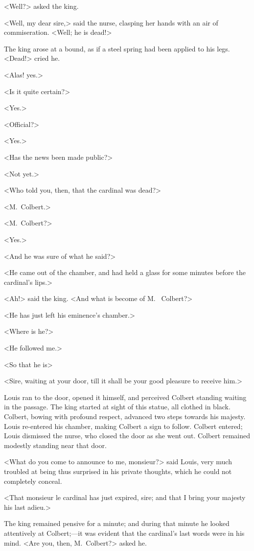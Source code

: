 <Well?> asked the king.

<Well, my dear sire,> said the nurse, clasping her hands with an air of commiseration. <Well; he is dead!>

The king arose at a bound, as if a steel spring had been applied to his legs. <Dead!> cried he.

<Alas! yes.>

<Is it quite certain?>

<Yes.>

<Official?>

<Yes.>

<Has the news been made public?>

<Not yet.>

<Who told you, then, that the cardinal was dead?>

<M.~Colbert.>

<M.~Colbert?>

<Yes.>

<And he was sure of what he said?>

<He came out of the chamber, and had held a glass for some minutes before the cardinal's lips.>

<Ah!> said the king. <And what is become of M.~ Colbert?>

<He has just left his eminence's chamber.>

<Where is he?>

<He followed me.>

<So that he is\longdash>

<Sire, waiting at your door, till it shall be your good pleasure to receive him.>

Louis ran to the door, opened it himself, and perceived Colbert standing waiting in the passage. The king started at sight of this statue, all clothed in black. Colbert, bowing with profound respect, advanced two steps towards his majesty. Louis re-entered his chamber, making Colbert a sign to follow. Colbert entered; Louis dismissed the nurse, who closed the door as she went out. Colbert remained modestly standing near that door.

<What do you come to announce to me, monsieur?> said Louis, very much troubled at being thus surprised in his private thoughts, which he could not completely conceal.

<That monsieur le cardinal has just expired, sire; and that I bring your majesty his last adieu.>

The king remained pensive for a minute; and during that minute he looked attentively at Colbert;—it was evident that the cardinal's last words were in his mind. <Are you, then, M.~Colbert?> asked he.

